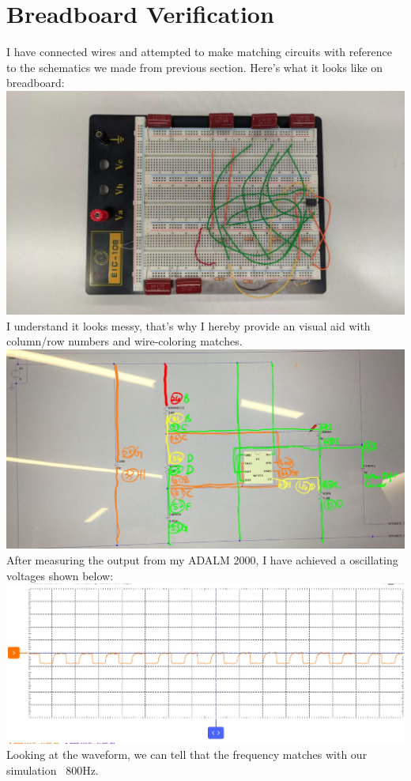 \documentclass{article}
\begin{document}
	\section{Breadboard Verification}
	I have connected wires and attempted to make matching circuits with reference to the schematics we made from previous section. Here's what it looks like on breadboard:\newline
	\includegraphics[width=\columnwidth]{BREA_SCHE}
	I understand it looks messy, that's why I hereby provide an visual aid with column/row numbers and wire-coloring matches.\newline
	\includegraphics[width=\columnwidth]{LTSP_BREA_AID}
	After measuring the output from my ADALM 2000, I have achieved a oscillating voltages shown below:\newline
	\includegraphics[width=\columnwidth]{BREA_WAVE}
	Looking at the waveform, we can tell that the frequency matches with our simulation ~800Hz.
\end{document}
